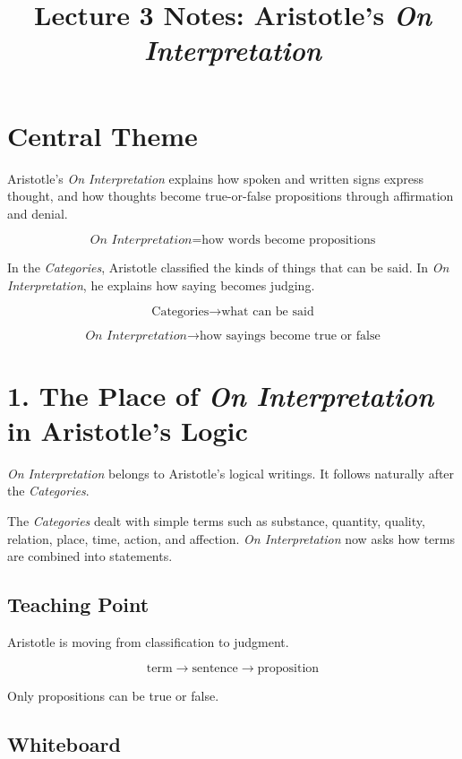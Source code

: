 \documentclass[12pt]{article}
\title{Lecture 3 Notes: Aristotle's \textit{On Interpretation}}
\author{}
\date{}
\begin{document}
\maketitle

\section*{Central Theme}

Aristotle's \textit{On Interpretation} explains how spoken and written signs
express thought, and how thoughts become true-or-false propositions through
affirmation and denial.

\[
\boxed{
\textit{On Interpretation} = \text{how words become propositions}
}
\]

In the \textit{Categories}, Aristotle classified the kinds of things that can be
said. In \textit{On Interpretation}, he explains how saying becomes judging.

\[
\text{Categories} \rightarrow \text{what can be said}
\]

\[
\textit{On Interpretation} \rightarrow \text{how sayings become true or false}
\]

\section*{1. The Place of \textit{On Interpretation} in Aristotle's Logic}

\textit{On Interpretation} belongs to Aristotle's logical writings. It follows
naturally after the \textit{Categories}.

The \textit{Categories} dealt with simple terms such as substance, quantity,
quality, relation, place, time, action, and affection. \textit{On Interpretation}
now asks how terms are combined into statements.

\subsection*{Teaching Point}

Aristotle is moving from classification to judgment.

\[
\text{term} \rightarrow \text{sentence} \rightarrow \text{proposition}
\]

Only propositions can be true or false.

\subsection*{Whiteboard}
\end{document}
